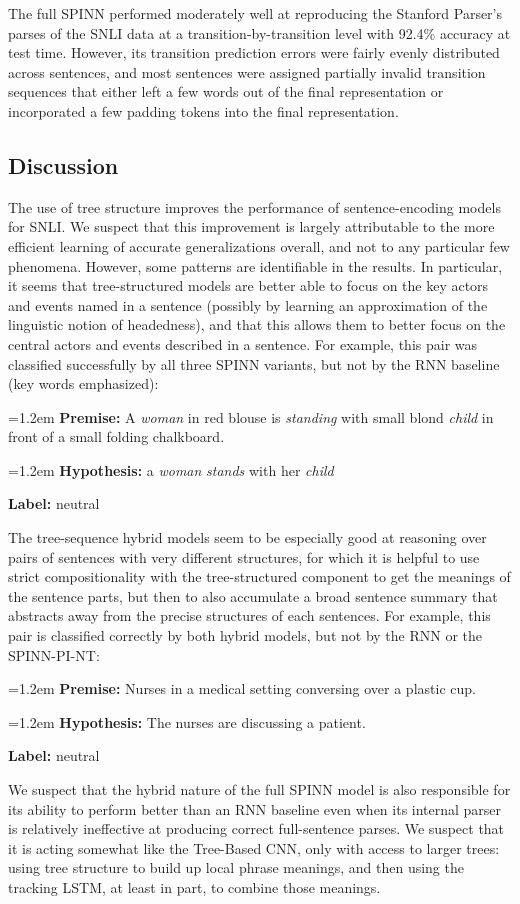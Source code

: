 \documentclass[11pt]{article}
\newcommand{\snli}[3]{{\vspace{0.25em}
{\small \setlength{\parindent}{0.6em} \hangindent=1.2em  \textbf{Premise:} #1\par}\vspace{0.25em}
{\small \setlength{\parindent}{0.6em} \hangindent=1.2em   \textbf{Hypothesis:} #2\par}\vspace{0.25em}
{\small \setlength{\parindent}{0.6em}  \textbf{Label:} #3\par}
}}
\begin{document}
The full SPINN performed moderately well at reproducing the Stanford Parser's parses of the SNLI data at a transition-by-transition level with 92.4\% accuracy at test time. However, its transition prediction errors were fairly evenly distributed across sentences, and most sentences were assigned partially invalid transition sequences that either left a few words out of the final representation or incorporated a few padding tokens into the final representation.

\subsection{Discussion}

The use of tree structure improves the performance of sentence-encoding models for SNLI. We suspect that this improvement is largely attributable to the more efficient learning of accurate generalizations overall, and not to any particular few phenomena. However, some patterns are identifiable in the results. In particular, it seems that tree-structured models are better able to focus on the key actors and events named in a sentence (possibly by learning an approximation of the linguistic notion of headedness), and that this allows them to better focus on the central actors and events described in a sentence. For example, this pair was classified successfully by all three SPINN variants, but not by the RNN baseline (key words emphasized):

\snli
{A \textit{woman} in red blouse is \textit{standing} with small blond \textit{child} in front of a small folding chalkboard.}
{a \textit{woman} \textit{stands} with her \textit{child}}
{neutral}

The tree-sequence hybrid models seem to be especially good at reasoning over pairs of sentences with very different structures, for which it is helpful to use strict compositionality with the tree-structured component to get the meanings of the sentence parts, but then to also accumulate a broad sentence summary that abstracts away from the precise structures of each sentences. For example, this pair is classified correctly by both hybrid models, but not by the RNN or the SPINN-PI-NT:

\snli{Nurses in a medical setting conversing over a plastic cup.}
{The nurses are discussing a patient.}
{neutral}

We suspect that the hybrid nature of the full SPINN model is also responsible for its ability to perform better than an RNN baseline even when its internal parser is relatively ineffective at producing correct full-sentence parses. We suspect that it is acting somewhat like the Tree-Based CNN, only with access to larger trees: using tree structure to build up local phrase meanings, and then using the tracking LSTM, at least in part, to combine those meanings.
\end{document}
